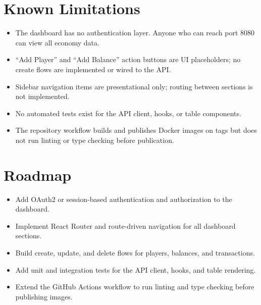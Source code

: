 \section{Known Limitations}

\begin{itemize}
  \item The dashboard has no authentication layer. Anyone who can reach port 8080 can view all economy data.
  \item ``Add Player'' and ``Add Balance'' action buttons are UI placeholders; no create flows are implemented or wired to the API.
  \item Sidebar navigation items are presentational only; routing between sections is not implemented.
  \item No automated tests exist for the API client, hooks, or table components.
  \item The repository workflow builds and publishes Docker images on tags but does not run linting or type checking before publication.
\end{itemize}

\section{Roadmap}

\begin{itemize}
  \item Add OAuth2 or session-based authentication and authorization to the dashboard.
  \item Implement React Router and route-driven navigation for all dashboard sections.
  \item Build create, update, and delete flows for players, balances, and transactions.
  \item Add unit and integration tests for the API client, hooks, and table rendering.
  \item Extend the GitHub Actions workflow to run linting and type checking before publishing images.
\end{itemize}
